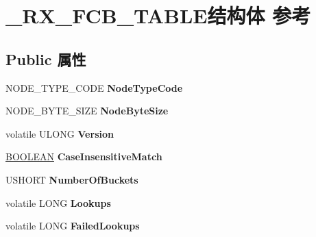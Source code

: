 \hypertarget{struct___r_x___f_c_b___t_a_b_l_e}{}\section{\+\_\+\+R\+X\+\_\+\+F\+C\+B\+\_\+\+T\+A\+B\+L\+E结构体 参考}
\label{struct___r_x___f_c_b___t_a_b_l_e}
\subsection*{Public 属性}
\begin{DoxyCompactItemize}
\item 
\mbox{\label{struct___r_x___f_c_b___t_a_b_l_e_a63adba87faccfc68d7017df24cd3d0ea}} 
N\+O\+D\+E\+\_\+\+T\+Y\+P\+E\+\_\+\+C\+O\+DE {\bfseries Node\+Type\+Code}
\item 
\mbox{\label{struct___r_x___f_c_b___t_a_b_l_e_aa998886c180c1f75b6cdc6f7035470c6}} 
N\+O\+D\+E\+\_\+\+B\+Y\+T\+E\+\_\+\+S\+I\+ZE {\bfseries Node\+Byte\+Size}
\item 
\mbox{\label{struct___r_x___f_c_b___t_a_b_l_e_a1dd7cde74e2136c8b4aae6ec46819bdd}} 
volatile U\+L\+O\+NG {\bfseries Version}
\item 
\mbox{\label{struct___r_x___f_c_b___t_a_b_l_e_a5d301e690fa9df15a5e69ebca21e8aab}} 
\hyperlink{_processor_bind_8h_a112e3146cb38b6ee95e64d85842e380a}{B\+O\+O\+L\+E\+AN} {\bfseries Case\+Insensitive\+Match}
\item 
\mbox{\label{struct___r_x___f_c_b___t_a_b_l_e_a34a6b2322e7217e6b7599e065d0071e8}} 
U\+S\+H\+O\+RT {\bfseries Number\+Of\+Buckets}
\item 
\mbox{\label{struct___r_x___f_c_b___t_a_b_l_e_a72b547729a712e111b776597bea73a6a}} 
volatile L\+O\+NG {\bfseries Lookups}
\item 
\mbox{\label{struct___r_x___f_c_b___t_a_b_l_e_a1ddbc88f3da763be5e40d4bc32cdae72}} 
volatile L\+O\+NG {\bfseries Failed\+Lookups}
\item 

\end{DoxyCompactItemize}
